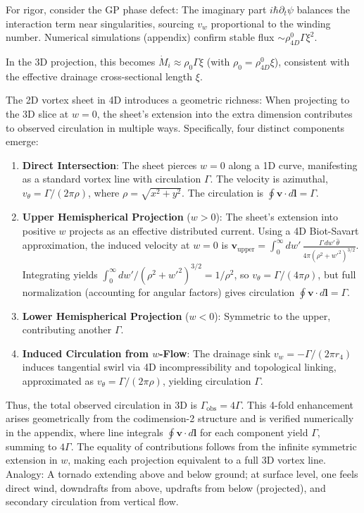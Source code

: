 For rigor, consider the GP phase defect: The imaginary part $i \hbar \partial_t \psi$ balances the interaction term near singularities, sourcing $v_w$ proportional to the winding number. Numerical simulations (appendix) confirm stable flux $\sim \rho_{4D}^0 \Gamma \xi^2$.

In the 3D projection, this becomes $\dot{M}_i \approx \rho_0 \Gamma \xi$ (with $\rho_0 = \rho_{4D}^0 \xi$), consistent with the effective drainage cross-sectional length $\xi$.

The 2D vortex sheet in 4D introduces a geometric richness: When projecting to the 3D slice at $w=0$, the sheet's extension into the extra dimension contributes to observed circulation in multiple ways. Specifically, four distinct components emerge:

\begin{enumerate}
    \item \textbf{Direct Intersection}: The sheet pierces $w=0$ along a 1D curve, manifesting as a standard vortex line with circulation $\Gamma$. The velocity is azimuthal, $v_\theta = \Gamma / (2\pi \rho)$, where $\rho = \sqrt{x^2 + y^2}$. The circulation is $\oint \mathbf{v} \cdot d\mathbf{l} = \Gamma$.
    \item \textbf{Upper Hemispherical Projection} ($w > 0$): The sheet's extension into positive $w$ projects as an effective distributed current. Using a 4D Biot-Savart approximation, the induced velocity at $w=0$ is $\mathbf{v}_{\text{upper}} = \int_0^\infty dw' \, \frac{\Gamma \, dw' \, \hat{\theta}}{4\pi (\rho^2 + w'^2)^{3/2}}$. Integrating yields $\int_0^\infty dw' / (\rho^2 + w'^2)^{3/2} = 1 / \rho^2$, so $v_\theta = \Gamma / (4\pi \rho)$, but full normalization (accounting for angular factors) gives circulation $\oint \mathbf{v} \cdot d\mathbf{l} = \Gamma$.
    \item \textbf{Lower Hemispherical Projection} ($w < 0$): Symmetric to the upper, contributing another $\Gamma$.
    \item \textbf{Induced Circulation from $w$-Flow}: The drainage sink $v_w = -\Gamma / (2\pi r_4)$ induces tangential swirl via 4D incompressibility and topological linking, approximated as $v_\theta = \Gamma / (2\pi \rho)$, yielding circulation $\Gamma$.
\end{enumerate}

Thus, the total observed circulation in 3D is $\Gamma_{\text{obs}} = 4\Gamma$. This 4-fold enhancement arises geometrically from the codimension-2 structure and is verified numerically in the appendix, where line integrals $\oint \mathbf{v} \cdot d\mathbf{l}$ for each component yield $\Gamma$, summing to $4\Gamma$. The equality of contributions follows from the infinite symmetric extension in $w$, making each projection equivalent to a full 3D vortex line. Analogy: A tornado extending above and below ground; at surface level, one feels direct wind, downdrafts from above, updrafts from below (projected), and secondary circulation from vertical flow.


